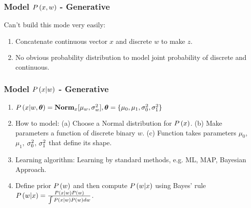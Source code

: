 \subsubsection*{Model $\P{x,w}$ - Generative}
Can't build this mode very easily:
	\begin{enumerate}
		\item Concatenate continuous vector $x$ and discrete $w$ to make $z$.
		\item No obvious probability distribution to model joint probability of discrete and continuous.
	\end{enumerate}

\subsubsection*{Model $\P{x|w}$ - Generative}
	\begin{enumerate}
		\item $\P{x|w,\vec{\th}}=\Norm_x[\mu_w,\si_w^2], \vec{\th}=\{\mu_0,\mu_1,\si_0^2,\si_1^2\}$
		\item How to model: (a) Choose a Normal distribution for $\P{x}$. (b) Make parameters a function of discrete binary $w$. (c) Function takes parameters $\mu_0$, $\mu_1$, $\si_0^2$, $\si_1^2$ that define its shape. 
		\item Learning algorithm: Learning by standard methods, e.g. ML, MAP, Bayesian Approach.
		\item Define prior $\P{w}$ and then compute $\P{w|x}$ using Bayes' rule $\P{w|x}=\frac{\P{x|w}\P{w}}{\int\P{x|w}\P{w}dw}$.
	\end{enumerate}